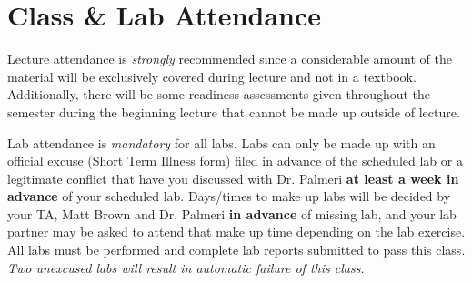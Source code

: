 \section{Class \& Lab Attendance}

Lecture attendance is \emph{strongly} recommended since a considerable amount
of the material will be exclusively covered during lecture and not in a textbook.
Additionally, there will be some readiness assessments given throughout the
semester during the beginning lecture that cannot be made up outside of lecture.

Lab attendance is \emph{mandatory} for all labs.  Labs can only be made up with
an official excuse (Short Term Illness form) filed in advance of the scheduled
lab or a legitimate conflict that have you discussed with Dr. Palmeri
\textbf{at least a week in advance} of your scheduled lab.  Days/times to make
up labs will be decided by your TA, Matt Brown and Dr. Palmeri \textbf{in
advance} of missing lab, and your lab partner may be asked to attend that make
up time depending on the lab exercise.  All labs must be performed and complete
lab reports submitted to pass this class.  \emph{Two unexcused labs will result
in automatic failure of this class.}
